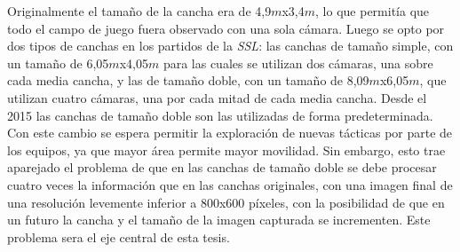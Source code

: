 Originalmente el tamaño de la cancha era de 4,9$m$x3,4$m$, lo que permitía que
todo el campo de juego fuera observado con una sola cámara. Luego se opto por
dos tipos de canchas en los partidos de la \emph{SSL}: las canchas de tamaño
simple, con un tamaño de 6,05$m$x4,05$m$ para las cuales se utilizan dos
cámaras, una sobre cada media cancha, y las de tamaño doble, con un tamaño de
8,09$m$x6,05$m$, que utilizan cuatro cámaras, una por cada mitad de cada media
cancha. Desde el 2015 las canchas de tamaño doble son las utilizadas de forma
predeterminada\cite{sslrules2015}. Con este cambio se espera permitir la
exploración de nuevas tácticas por parte de los equipos, ya que mayor área
permite mayor movilidad. Sin embargo, esto trae aparejado el problema de que en
las canchas de tamaño doble se debe procesar cuatro veces la información que en
las canchas originales, con una imagen final de una resolución levemente
inferior a 800x600 píxeles, con la posibilidad de que en un futuro la cancha y
el tamaño de la imagen capturada se incrementen. Este problema sera el eje
central de esta tesis.


